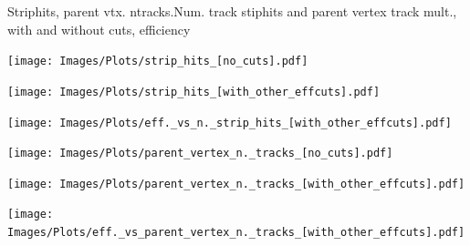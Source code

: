 \documentclass{beamer}
\begin{document}
\begin{frame}{Striphits, parent vtx. ntracks.}{Num. track stiphits and parent vertex track mult., with and without cuts, efficiency}
  \begin{minipage}{0.32\textwidth}
    \centering
    \texttt{[image: Images/Plots/strip\_hits\_[no\_cuts].pdf]}
  \end{minipage}%
  \hspace{0.01\textwidth}%
  \begin{minipage}{0.32\textwidth}
    \centering
    \texttt{[image: Images/Plots/strip\_hits\_[with\_other\_effcuts].pdf]}
  \end{minipage}%
  \hspace{0.01\textwidth}%
  \begin{minipage}{0.32\textwidth}
    \centering
    \texttt{[image: Images/Plots/eff.\_vs\_n.\_strip\_hits\_[with\_other\_effcuts].pdf]}
  \end{minipage}
  \vspace*{0.2cm}
  \begin{minipage}{0.32\textwidth}
    \centering
    \texttt{[image: Images/Plots/parent\_vertex\_n.\_tracks\_[no\_cuts].pdf]}
  \end{minipage}%
  \hspace{0.01\textwidth}%
  \begin{minipage}{0.32\textwidth}
    \centering
    \texttt{[image: Images/Plots/parent\_vertex\_n.\_tracks\_[with\_other\_effcuts].pdf]}
  \end{minipage}%
  \hspace{0.01\textwidth}%
  \begin{minipage}{0.32\textwidth}
    \centering
    \texttt{[image: Images/Plots/eff.\_vs\_parent\_vertex\_n.\_tracks\_[with\_other\_effcuts].pdf]}
  \end{minipage}
\end{frame}
\end{document}
